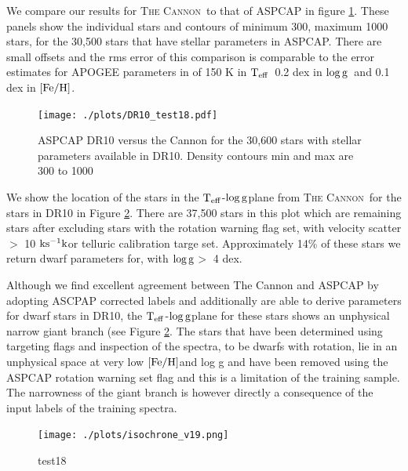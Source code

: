 \documentclass[12pt, preprint]{aastex}
\newcommand{\teff}{\mbox{$\rm T_{eff}$}}
\newcommand{\kms}{\mbox{$\rm ks^{-1} k$}}
\newcommand{\feh}{\mbox{$\rm [Fe/H]$}}
\newcommand{\logg}{\mbox{$\rm \log g$}}
\newcommand{\tc}{\textsc{The Cannon}}
\begin{document}
We compare our results for \tc\ to that of ASPCAP in figure \ref{fig:DR10_compare}. These panels show the individual stars and contours of minimum 300, maximum 1000 stars, for the 30,500 stars that have stellar parameters in ASPCAP. There are small offsets and the rms error of this comparison is comparable to the error estimates for APOGEE parameters in \citet{Meszaros2013} of 150 K in \teff\, 0.2 dex in \logg\ and 0.1 dex in \feh. 


\begin{figure}[h!]
\centering
        \texttt{[image: ./plots/DR10\_test18.pdf]} \\
\caption{\small{ASPCAP DR10 versus the Cannon for the 30,600 stars with stellar parameters available in DR10. Density contours min and max are 300 to 1000 }}
\label{fig:DR10_compare}
\end{figure}

We show the location of the stars in the \teff-\logg plane from \tc\ for the stars in DR10 in Figure \ref{fig:test18}. There are 37,500 stars in this plot which are remaining stars after excluding stars with the  rotation warning flag set, with  velocity scatter $>$ 10 \kms or telluric calibration targe set. Approximately 14\% of these stars we return dwarf parameters for, with \logg $>$ 4 dex.  

Although we find excellent agreement between The Cannon and ASPCAP by adopting ASCPAP corrected labels and additionally are able to derive parameters for dwarf stars in DR10, the \teff-\logg plane for these stars shows an unphysical narrow giant branch  (see Figure \ref{fig:test18}. The stars that have been determined using targeting flags and inspection of the spectra, to be dwarfs with rotation, lie in an unphysical space at very low \feh and log g and have been removed using the ASPCAP rotation warning set flag and this is a limitation of the training sample. The narrowness of the giant branch is however directly a consequence of the input labels of the training spectra. 


\begin{figure}[h!]
  \texttt{[image: ./plots/isochrone\_v19.png]}
\caption{test18}
\label{fig:test18}
\end{figure}
\end{document}
